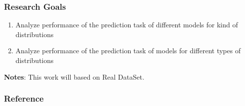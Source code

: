 \documentclass[xcolor=svgnames]{beamer}
\begin{document}

\begin{frame}\frametitle{Research Goals}

  \begin{enumerate}
    \item Analyze performance of the prediction task of different models for kind of distributions
    \item Analyze performance of the prediction task of models for different types of distributions
  \end{enumerate}

  \vspace{1em}
  \hspace{1em}\textbf{Notes}: This work will based on Real DataSet.


\end{frame}




\begin{frame}\frametitle{Reference}


\end{frame}
\end{document}
